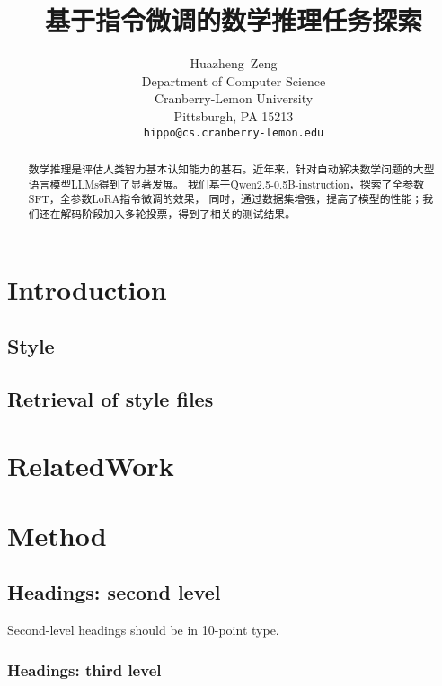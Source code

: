 \documentclass{article}
\title{基于指令微调的数学推理任务探索}
\author{
    Huazheng~Zeng\\
    Department of Computer Science \\
    Cranberry-Lemon University \\
    Pittsburgh, PA 15213 \\
    \texttt{hippo@cs.cranberry-lemon.edu} \\
}
\begin{document}
\maketitle


\begin{abstract}
  数学推理是评估人类智力基本认知能力的基石。近年来，针对自动解决数学问题的大型语言模型LLMs得到了显著发展。
  我们基于Qwen2.5-0.5B-instruction，探索了全参数SFT，全参数LoRA指令微调的效果，
  同时，通过数据集增强，提高了模型的性能；我们还在解码阶段加入多轮投票，得到了相关的测试结果。
\end{abstract}



\section{Introduction}




\subsection{Style}



\subsection{Retrieval of style files}





\section{RelatedWork}




\section{Method}



\subsection{Headings: second level}


Second-level headings should be in 10-point type.


\subsubsection{Headings: third level}
\end{document}
